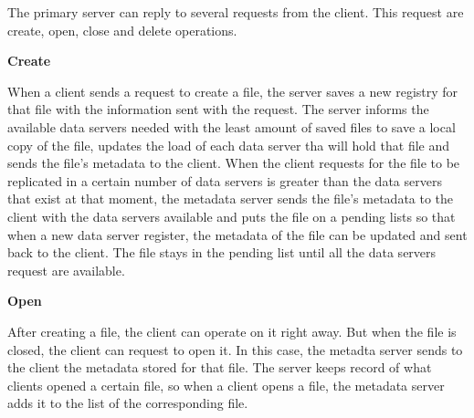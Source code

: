 The primary server can reply to several requests from the client. This
request are create, open, close and delete operations.

\medskip
\textbf{Create}
\smallskip 

When a client sends a request to create a file, the server saves a new
registry for that file with the information sent with the request. The
server informs the available data servers needed with the least amount
of saved files to save a local copy of the file, updates the load
of each data server tha will hold that file and sends the file's metadata
to the client. When the client requests for the file to be replicated in
a certain number of data servers is greater than the data servers that 
exist at that moment, the metadata server sends the file's metadata to 
the client with the data servers available and puts the file on a pending 
lists so that when a new data server register, the metadata of the file 
can be updated and sent back to the client. The file stays in the pending 
list until all the data servers request are available.


\medskip
\textbf{Open}
\smallskip

After creating a file, the client can operate on it right away. But when
the file is closed, the client can request to open it. In this case, the
metadta server sends to the client the metadata stored for that file. The
server keeps record of what clients opened a certain file, so when a client
opens a file, the metadata server adds it to the list of the corresponding
file.


